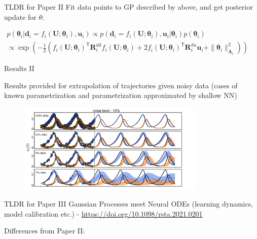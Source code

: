 \documentclass[usenames,dvipsnames]{beamer}
\theoremstyle{definition}
\let\oldcite=\cite
\renewcommand{\cite}[2][]{\textcolor{green}{\oldcite[#1]{#2}}}
\begin{document}
\begin{frame}{TLDR for Paper II}
    Fit data points to GP described by above, and get posterior update for $\theta$:

    $\begin{gathered}p\left(\boldsymbol{\theta}_i|\mathbf{d}_i=f_i(\mathbf{U};\boldsymbol{\theta}_i),\mathbf{u}_i\right)\propto p\left(\mathbf{d}_i=f_i(\mathbf{U};\boldsymbol{\theta}_i),\mathbf{u}_i|\left.\boldsymbol{\theta}_i\right)p(\boldsymbol{\theta}_i)\right.\\\propto \exp\left(-\frac12\left(f_i(\mathbf{U};\boldsymbol{\theta}_i)^\mathsf{T}\mathbf{R}_i^{dd}f_i(\mathbf{U};\boldsymbol{\theta}_i)+2f_i(\mathbf{U};\boldsymbol{\theta}_i)^\mathsf{T}\mathbf{R}_i^{du}\mathbf{u}_i+\|\boldsymbol{\theta}_i\|_{\boldsymbol{\Lambda}_i}^2\right)\right)\end{gathered}$
    
\end{frame}


\begin{frame}{Results II}
    
Results provided for extrapolation of trajectories given noisy data (cases of known parametrization and parametrization approximated by shallow NN)

\begin{figure}
    \centering
    \includegraphics[width=0.8\textwidth]{noisy_data_reconstruction.png}
    \label{f: noisy_uc}
\end{figure}
\end{frame}


\begin{frame}{TLDR for Paper III}
    Gaussian Processes meet Neural ODEs (learning dynamics, model calibration etc.) - \url{https://doi.org/10.1098/rsta.2021.0201} \cite{bhouri_gaussian_2022}

    Differences from Paper II:

\end{frame}
\end{document}
